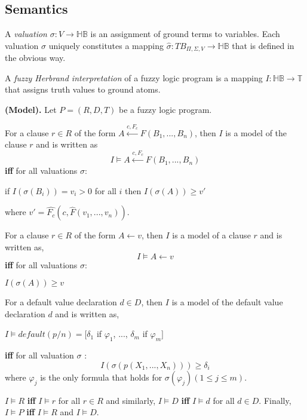 \documentclass[main.tex]{subfiles}
\begin{document}
\subsection{Semantics}
\label{sec:RFuzzyFrameworkSemantics}
A \textit{valuation} $\sigma : V \rightarrow \mathbb{HB}$ is an assignment of ground terms to variables. Each valuation $\sigma$ uniquely constitutes a mapping $\hat{\sigma} : TB_{\Pi,\Sigma,V} \rightarrow \mathbb{HB}$ that is defined in the obvious way.

A \textit{fuzzy Herbrand interpretation} of a fuzzy logic program is a mapping $I : \mathbb{HB} \rightarrow \mathbb{T}$ that assigns truth values to ground atoms.

\begin{defin}\textbf{(Model).}
\label{def:Model}
Let $P=(R,D,T)$ be a fuzzy logic program.

For a clause $r\in R$ of the form $A \stackrel{c,F_c}{\longleftarrow} F(B_1,...,B_n)$, then $I$ is a model of the clause $r$ and is written as 
\[I \models A \stackrel{c,F_c}{\longleftarrow} F(B_1,...,B_n)\]
\textbf{iff} for all valuations $\sigma$:
\begin{center}
 if $I(\sigma(B_i))=v_i>0$ for all $i$ then $I(\sigma(A))\geq v'$
\end{center}
where $v'= \hat{F_c}(c,\hat{F}(v_1,...,v_n))$.

For a clause $r \in R$ of the form $A \leftarrow v$, then $I$ is a model of a clause $r$ and is written as,
\[I \models A \leftarrow v\]
\textbf{iff} for all valuations $\sigma$:
\begin{center}
 $I(\sigma(A)) \geq v$
\end{center}

For a default value declaration $d \in D$, then $I$ is a model of the default value declaration $d$ and is written as,
\begin{center}
$I \models default(p/n)=[\delta_1$ if $\varphi_1$, ..., $\delta_m$ if $\varphi_m]$
\end{center}
\textbf{iff} for all valuation $\sigma$ :
\[I(\sigma(p(X_1, ..., X_n))) \geq \delta_i\]
where $\varphi_j$ is the only formula that holds for $\sigma(\varphi_j)(1 \leq j \leq m)$.
\end{defin}

$I \models R$ \textbf{iff} $I \models r$ for all $r \in R$ and similarly, $I \models D$ \textbf{iff} $I \models d$ for all $d \in D$.
Finally, $I \models P$ \textbf{iff} $I \models R$ and $I \models D$.
\end{document}
